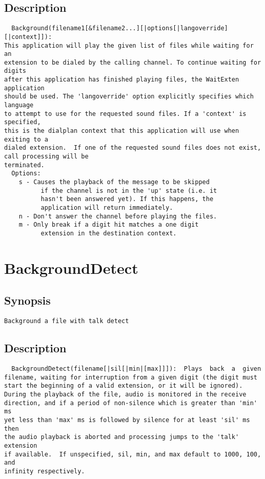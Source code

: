 \subsection{Description}
\begin{verbatim}
  Background(filename1[&filename2...][|options[|langoverride][|context]]):
This application will play the given list of files while waiting for an
extension to be dialed by the calling channel. To continue waiting for digits
after this application has finished playing files, the WaitExten application
should be used. The 'langoverride' option explicitly specifies which language
to attempt to use for the requested sound files. If a 'context' is specified,
this is the dialplan context that this application will use when exiting to a
dialed extension.  If one of the requested sound files does not exist, call processing will be
terminated.
  Options:
    s - Causes the playback of the message to be skipped
          if the channel is not in the 'up' state (i.e. it
          hasn't been answered yet). If this happens, the
          application will return immediately.
    n - Don't answer the channel before playing the files.
    m - Only break if a digit hit matches a one digit
          extension in the destination context.

\end{verbatim}


\section{BackgroundDetect}
\subsection{Synopsis}
\begin{verbatim}
Background a file with talk detect
\end{verbatim}
\subsection{Description}
\begin{verbatim}
  BackgroundDetect(filename[|sil[|min|[max]]]):  Plays  back  a  given
filename, waiting for interruption from a given digit (the digit must
start the beginning of a valid extension, or it will be ignored).
During the playback of the file, audio is monitored in the receive
direction, and if a period of non-silence which is greater than 'min' ms
yet less than 'max' ms is followed by silence for at least 'sil' ms then
the audio playback is aborted and processing jumps to the 'talk' extension
if available.  If unspecified, sil, min, and max default to 1000, 100, and
infinity respectively.

\end{verbatim}


